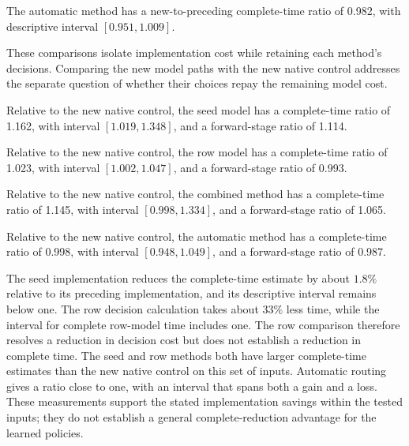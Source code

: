 The automatic method has a new-to-preceding complete-time ratio of 0.982, with descriptive interval $[0.951,1.009]$.

These comparisons isolate implementation cost while retaining each method's
decisions. Comparing the new model paths with the new native control addresses
the separate question of whether their choices repay the remaining model cost.

\begin{samepage}
Relative to the new native control, the seed model has a complete-time ratio of 1.162, with interval $[1.019,1.348]$, and a forward-stage ratio of 1.114.
\par\end{samepage}

\begin{samepage}
Relative to the new native control, the row model has a complete-time ratio of 1.023, with interval $[1.002,1.047]$, and a forward-stage ratio of 0.993.
\par\end{samepage}

\begin{samepage}
Relative to the new native control, the combined method has a complete-time ratio of 1.145, with interval $[0.998,1.334]$, and a forward-stage ratio of 1.065.
\par\end{samepage}

\begin{samepage}
Relative to the new native control, the automatic method has a complete-time ratio of 0.998, with interval $[0.948,1.049]$, and a forward-stage ratio of 0.987.
\par\end{samepage}

The seed implementation reduces the complete-time estimate by about $1.8\%$
relative to its preceding implementation, and its descriptive interval remains
below one. The row decision calculation takes about $33\%$ less time, while
the interval for complete row-model time includes one. The row comparison
therefore resolves a reduction in decision cost but does not establish a
reduction in complete time. The seed and row methods both have larger
complete-time estimates than the new native control on this set of inputs.
Automatic routing gives a ratio close to one, with an interval that spans
both a gain and a loss. These measurements support the stated implementation
savings within the tested inputs; they do not establish a general
complete-reduction advantage for the learned policies.


